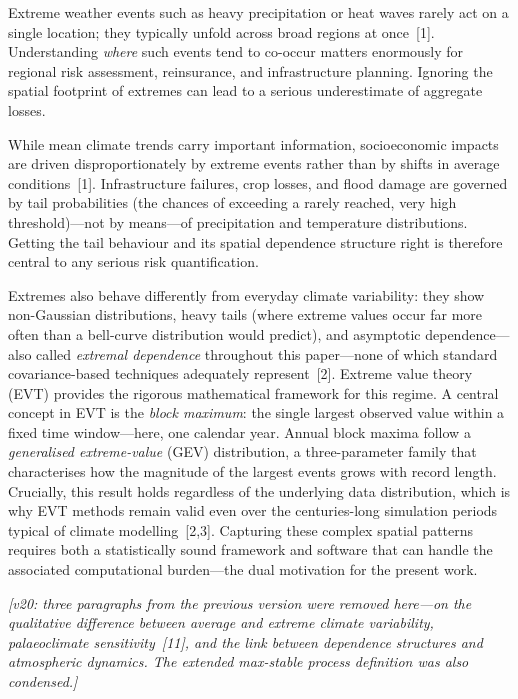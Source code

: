 \documentclass[preprint,12pt,a4paper]{elsarticle}
\newcommand{\revg}[1]{{#1}}
\newcommand{\revn}[1]{{\color{RevisionViolet}#1}}
\begin{document}
Extreme weather events such as heavy precipitation or heat waves
rarely act on a single location; they typically unfold across broad
regions at once~[1]. Understanding \emph{where} such events tend to
co-occur matters enormously for regional risk assessment, reinsurance,
and infrastructure planning. Ignoring the spatial footprint of
extremes can lead to a serious underestimate of aggregate losses.

\revg{While mean climate trends carry important information,
socioeconomic impacts are driven disproportionately by extreme events
rather than by shifts in average conditions~[1]. Infrastructure
failures, crop losses, and flood damage are governed by tail
probabilities (the chances of exceeding a rarely reached, very high
threshold)---not by means---of precipitation and temperature
distributions. Getting the tail behaviour and its spatial dependence
structure right is therefore central to any serious risk
quantification.}

\revg{Extremes also behave differently from everyday climate
variability: they show non-Gaussian distributions, heavy
tails (where extreme values occur far more often than a bell-curve
distribution would predict), and asymptotic dependence---also called
\emph{extremal dependence} throughout this paper---none of which standard
covariance-based techniques adequately represent~[2]. Extreme
value theory (EVT) provides the rigorous mathematical framework
for this regime. A central concept in EVT is the \emph{block
maximum}: the single largest observed value within a fixed time
window---here, one calendar year. Annual block maxima follow a
\emph{generalised extreme-value} (GEV) distribution, a
three-parameter family that characterises how the magnitude of the
largest events grows with record length. Crucially, this result
holds regardless of the underlying data distribution, which is why
EVT methods remain valid even over the centuries-long simulation
periods typical of climate modelling~[2,3]. Capturing these complex
spatial patterns requires both a statistically sound framework and
software that can handle the associated computational burden---the
dual motivation for the present work.}

\revn{\textit{[v20: three paragraphs from the previous version were removed here---on the qualitative difference between average and extreme climate variability, palaeoclimate sensitivity~[11], and the link between dependence structures and atmospheric dynamics. The extended max-stable process definition was also condensed.]}}
\end{document}
